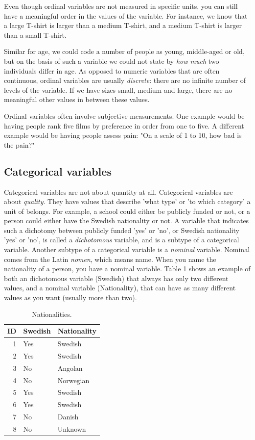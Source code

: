 \documentclass[]{book}\usepackage[]{graphicx}\usepackage[]{color}
\begin{document}
Even though ordinal variables are not measured in specific units, you can still have a meaningful order in the values of the variable. For instance, we know that a large T-shirt is larger than a medium T-shirt, and a medium T-shirt is larger than a small T-shirt.

Similar for age, we could code a number of people as young, middle-aged or old, but on the basis of such a variable we could not state by \textit{how much} two individuals differ in age. As opposed to numeric variables that are often continuous, ordinal variables are usually \textit{discrete}: there are no infinite number of levels of the variable. If we have sizes small, medium and large, there are no meaningful other values in between these values.

Ordinal variables often involve subjective measurements. One example would be having people rank five films by preference in order from one to five. A different example would be having people assess pain: "On a scale of 1 to 10, how bad is the pain?"

\subsection{Categorical variables}

Categorical variables are not about quantity at all. Categorical variables are about \textit{quality}. They have values that describe 'what type' or 'to which category' a unit of belongs. For example, a school could either be publicly funded or not, or a person could either have the Swedish nationality or not. A variable that indicates such a dichotomy between publicly funded 'yes' or 'no', or Swedish nationality 'yes' or 'no', is called a \textit{dichotomous} variable, and is a subtype of a categorical variable. Another subtype of a categorical variable is a \textit{nominal} variable. Nominal comes from the Latin \textit{nomen}, which means name. When you name the nationality of a person, you have a nominal variable. Table \ref{tab:data_9} shows an example of both an dichotomous variable (Swedish) that always has only two different values, and a nominal variable (Nationality), that can have as many different values as you want (usually more than two).



\begin{table}[ht]
\centering
\caption{Nationalities.} 
\label{tab:data_9}
\begin{tabular}{rll}
  \hline
ID & Swedish & Nationality \\ 
  \hline
1 & Yes & Swedish \\ 
  2 & Yes & Swedish \\ 
  3 & No & Angolan \\ 
  4 & No & Norwegian \\ 
  5 & Yes & Swedish \\ 
  6 & Yes & Swedish \\ 
  7 & No & Danish \\ 
  8 & No & Unknown \\ 
   \hline
\end{tabular}
\end{table}
\end{document}
